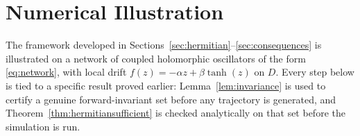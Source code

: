 \documentclass[preprint,12pt,authoryear]{elsarticle}
\begin{document}
%
%
%

\section{Numerical Illustration}
\label{sec:numerics}

The framework developed in Sections~\ref{sec:hermitian}--\ref{sec:consequences} is illustrated on a network of coupled holomorphic oscillators of the form \eqref{eq:network}, with local drift $f(z)=-\alpha z+\beta\tanh(z)$ on $D$. Every step below is tied to a specific result proved earlier: Lemma~\ref{lem:invariance} is used to certify a genuine forward-invariant set before any trajectory is generated, and Theorem~\ref{thm:hermitiansufficient} is checked analytically on that set before the simulation is run.
\end{document}
